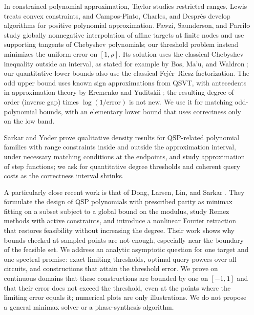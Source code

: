 In constrained polynomial approximation, Taylor \cite{taylor1968} studies restricted ranges, Lewis \cite{lewis1973} treats convex constraints, and Campos-Pinto, Charles, and Despr\'es \cite{campos2019} develop algorithms for positive polynomial approximation. Fawzi, Saunderson, and Parrilo \cite[Sections 3.1--3.2 and Appendix A, Lemma 1]{fawzi2017} study globally nonnegative interpolation of affine targets at finite nodes and use supporting tangents of Chebyshev polynomials; our threshold problem instead minimizes the uniform error on $[1,\rho]$. Its solution uses the classical Chebyshev inequality outside an interval, as stated for example by Bos, Ma'u, and Waldron \cite[Proposition 2.1]{bos2020}; our quantitative lower bounds also use the classical Fej\'er--Riesz factorization. The odd upper bound uses known sign approximations from QSVT, with antecedents in approximation theory by Eremenko and Yuditskii \cite{eremenko2007,eremenko2011}; the resulting degree of order (inverse gap) times $\log(1/\text{error})$ is not new. We use it for matching odd-polynomial bounds, with an elementary lower bound that uses correctness only on the low band.

Sarkar and Yoder \cite{sarkar2023} prove qualitative density results for QSP-related polynomial families with range constraints inside and outside the approximation interval, under necessary matching conditions at the endpoints, and study approximation of step functions; we ask for quantitative degree thresholds and coherent query costs as the correctness interval shrinks.

A particularly close recent work is that of Dong, Larsen, Lin, and Sarkar \cite{dong2026}. They formulate the design of QSP polynomials with prescribed parity as minimax fitting on a subset subject to a global bound on the modulus, study Remez methods with active constraints, and introduce a nonlinear Fourier retraction that restores feasibility without increasing the degree. Their work shows why bounds checked at sampled points are not enough, especially near the boundary of the feasible set. We address an analytic asymptotic question for one target and one spectral promise: exact limiting thresholds, optimal query powers over all circuits, and constructions that attain the threshold error. We prove on continuous domains that these constructions are bounded by one on $[-1,1]$ and that their error does not exceed the threshold, even at the points where the limiting error equals it; numerical plots are only illustrations. We do not propose a general minimax solver or a phase-synthesis algorithm.

